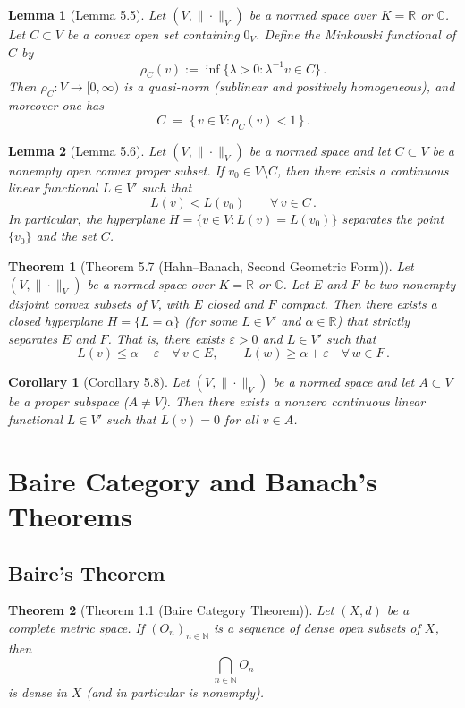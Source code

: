 \documentclass{article}
\theoremstyle{plain}
\newtheorem*{theorem*}{Theorem}
\newtheorem*{lemma*}{Lemma}
\newtheorem*{corollary*}{Corollary}
\begin{document}
\begin{lemma*}[Lemma 5.5]
Let $(V,\|\cdot\|_V)$ be a normed space over $K=\mathbb{R}$ or $\mathbb{C}$. Let $C \subset V$ be a convex open set containing $0_V$. Define the Minkowski functional of $C$ by 
\[ 
\rho_C(v) := \inf\{\lambda > 0: \lambda^{-1} v \in C\}\,. 
\] 
Then $\rho_C: V \to [0,\infty)$ is a quasi-norm (sublinear and positively homogeneous), and moreover one has 
\[ 
C \;=\; \{\,v \in V : \rho_C(v) < 1\,\}\,. 
\]
\end{lemma*}

\begin{lemma*}[Lemma 5.6]
Let $(V,\|\cdot\|_V)$ be a normed space and let $C \subset V$ be a nonempty open convex proper subset. If $v_0 \in V \setminus C$, then there exists a continuous linear functional $L \in V'$ such that 
\[ 
L(v) < L(v_0) \qquad \forall\,v \in C\,.
\] 
In particular, the hyperplane $H = \{ v \in V : L(v) = L(v_0)\}$ separates the point $\{v_0\}$ and the set $C$. 
\end{lemma*}

\begin{theorem*}[Theorem 5.7 (Hahn–Banach, Second Geometric Form)]
Let $(V,\|\cdot\|_V)$ be a normed space over $K=\mathbb{R}$ or $\mathbb{C}$. Let $E$ and $F$ be two nonempty disjoint convex subsets of $V$, with $E$ closed and $F$ compact. Then there exists a closed hyperplane $H = \{L = \alpha\}$ (for some $L\in V'$ and $\alpha \in \mathbb{R}$) that \emph{strictly} separates $E$ and $F$. That is, there exists $\varepsilon > 0$ and $L \in V'$ such that 
\[ 
L(v) \le \alpha - \varepsilon \quad \forall\,v \in E, \qquad 
L(w) \ge \alpha + \varepsilon \quad \forall\,w \in F\,.
\]
\end{theorem*}

\begin{corollary*}[Corollary 5.8]
Let $(V,\|\cdot\|_V)$ be a normed space and let $A \subset V$ be a proper subspace ($A \neq V$). Then there exists a nonzero continuous linear functional $L \in V'$ such that $L(v) = 0$ for all $v \in A$. 
\end{corollary*}

\section{Baire Category and Banach’s Theorems}

\subsection*{Baire’s Theorem}
\begin{theorem*}[Theorem 1.1 (Baire Category Theorem)]
Let $(X,d)$ be a complete metric space. If $(O_n)_{n\in\mathbb{N}}$ is a sequence of dense open subsets of $X$, then 
\[ 
\bigcap_{n\in\mathbb{N}} O_n 
\] 
is dense in $X$ (and in particular is nonempty).
\end{theorem*}
\end{document}
